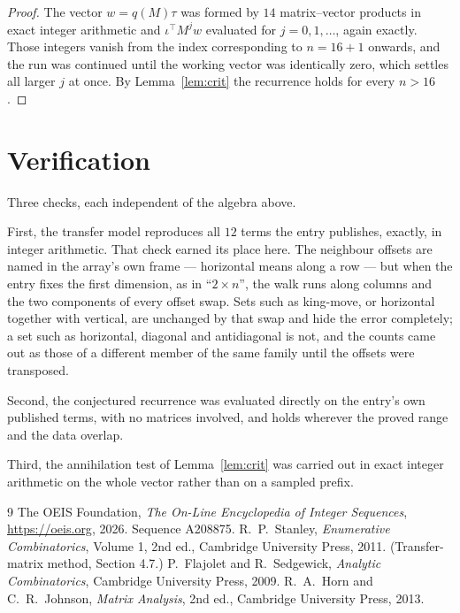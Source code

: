 \documentclass[11pt,a4paper]{article}
\theoremstyle{plain}
\theoremstyle{definition}
\begin{document}
\begin{proof}
The vector $w=q(M)\tau$ was formed by $14$ matrix--vector products in exact integer
arithmetic and $\iota^{\!\top}M^{j}w$ evaluated for $j=0,1,\dots$, again exactly. Those
integers vanish from the index corresponding to $n=16+1$ onwards, and the run was
continued until the working vector was identically zero, which settles all larger $j$ at once.
By Lemma~\ref{lem:crit} the recurrence holds for every $n>16$.
\end{proof}

\section{Verification}

Three checks, each independent of the algebra above.

First, the transfer model reproduces all $12$ terms the entry publishes, exactly, in
integer arithmetic. That check earned its place here. The neighbour offsets are named in the
array's own frame --- horizontal means along a row --- but when the entry fixes the first
dimension, as in ``$2\times n$'', the walk runs along columns and the two components of every
offset swap. Sets such as king-move, or horizontal together with vertical, are unchanged by
that swap and hide the error completely; a set such as horizontal, diagonal and antidiagonal
is not, and the counts came out as those of a different member of the same family until the
offsets were transposed.

Second, the conjectured recurrence was evaluated directly on the entry's own published terms,
with no matrices involved, and holds wherever the proved range and the data overlap.

Third, the annihilation test of Lemma~\ref{lem:crit} was carried out in exact integer
arithmetic on the whole vector rather than on a sampled prefix.

\begin{thebibliography}{9}
 The OEIS Foundation, \emph{The On-Line Encyclopedia of Integer
Sequences}, \url{https://oeis.org}, 2026. Sequence A208875.
 R.~P.~Stanley, \emph{Enumerative Combinatorics}, Volume 1, 2nd ed.,
Cambridge University Press, 2011. (Transfer-matrix method, Section 4.7.)
 P.~Flajolet and R.~Sedgewick, \emph{Analytic Combinatorics}, Cambridge
University Press, 2009.
 R.~A.~Horn and C.~R.~Johnson, \emph{Matrix Analysis}, 2nd ed., Cambridge
University Press, 2013.
\end{thebibliography}
\end{document}
